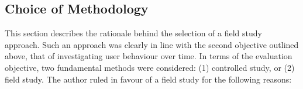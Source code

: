 \subsection{Choice of Methodology}
\label{main-study:method-choice}

This section describes the rationale behind the selection of a field study approach.  Such an approach was clearly in line with the second objective outlined above, that of investigating user behaviour over time.  In terms of the evaluation objective, two fundamental methods were considered: (1) controlled study, or (2) field study. %
The author ruled in favour of a field study for the following reasons: 




